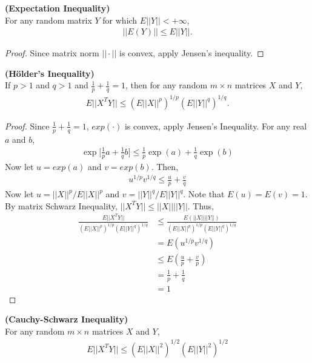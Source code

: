 \documentclass[11pt]{article} %
\theoremstyle{definition}
\numberwithin{defn}{subsection}
\numberwithin{thm}{subsection}
\numberwithin{ex}{subsection}
\begin{document}
\begin{thm}\label{thm:expectationineq}
	\textbf{(Expectation Inequality)}\\
	For any random matrix $Y$ for which $E||Y||<+\infty$,
	\begin{align*}
	||E(Y)||\le E||Y||.
	\end{align*}
	\begin{proof}
		Since matrix norm $||\cdot||$ is convex, apply Jensen's inequality.
	\end{proof}
\end{thm}


\begin{thm}\label{thm:holdersineq}
	\textbf{(H\"{o}lder's Inequality)}\\
	If $p>1$ and $q>1$ and $\frac{1}{p}+\frac{1}{q}=1$, then for any random $m\times n$ matrices $X$ and $Y$,
	\begin{align*}
	E||X^TY||\le(E||X||^p)^{1/p}(E||Y||^q)^{1/q}.
	\end{align*}
	\begin{proof}
		Since $\frac{1}{p}+\frac{1}{q}=1$, $exp(\cdot)$ is convex, apply Jensen's Inequality. For any real $a$ and $b$,
		\begin{align*}
		\exp\Big[\frac{1}{p}a+\frac{1}{q}b\Big]\le\frac{1}{p}\exp(a)+\frac{1}{q}\exp(b)
		\end{align*}
		Now let $u=exp(a)$ and $v=exp(b)$. Then,
		\begin{align*}
		u^{1/p}v^{1/q}\le\frac{u}{p}+\frac{v}{q}
		\end{align*}
		Now let $u=||X||^p/E||X||^p$ and $v=||Y||^q/E||Y||^q$. Note that $E(u)=E(v)=1$. By matrix Schwarz Inequality, $||X^TY||\le||X||||Y||$. Thus,
		\begin{align*}
		\frac{E||X^TY||}{(E||X||^p)^{1/p}(E||Y||^q)^{1/q}}&\le\frac{E(||X||||Y||)}{(E||X||^p)^{1/p}(E||Y||^q)^{1/q}}\\
		&=E(u^{1/p}v^{1/q})\\
		&\le E(\frac{u}{p}+\frac{v}{p})\\
		&=\frac{1}{p}+\frac{1}{q}\\
		&=1
		\end{align*}
	\end{proof}
\end{thm}

\begin{thm}\label{thm:CSineq}
	\textbf{(Cauchy-Schwarz Inequality)}\\
	For any random $m\times n$ matrices $X$ and $Y$,
	\begin{align*}
	E||X^TY||\le (E||X||^2)^{1/2}(E||Y||^2)^{1/2}
	\end{align*}
\end{thm}
\end{document}
